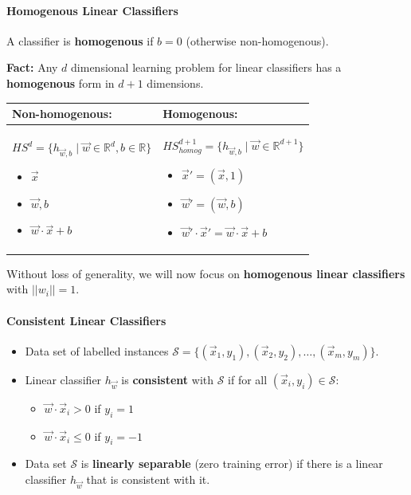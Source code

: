 \paragraph{Homogenous Linear Classifiers}

A classifier is \textbf{homogenous} if $b = 0$ (otherwise non-homogenous).

\textbf{Fact:} Any $d$ dimensional learning problem for linear classifiers has a \textbf{homogenous} form in $d+1$ dimensions.

\begin{center}
\begin{tabular}{|p{}|p{}|}
\hline
\textbf{Non-homogenous:} &
\textbf{Homogenous:} \\
\hline
$HS^d = \{ h_{\vec{w},b} \mid \vec{w} \in \mathbb{R}^d, b \in \mathbb{R} \}$

\begin{itemize}
    \item $\vec{x}$
    \item $\vec{w}, b$
    \item $\vec{w} \cdot \vec{x} + b$
\end{itemize}
&
$HS^{d+1}_{homog} = \{ h_{\vec{w},b} \mid \vec{w} \in \mathbb{R}^{d+1} \}$

\begin{itemize}
    \item $\vec{x}' = (\vec{x}, 1)$
    \item $\vec{w}' = (\vec{w}, b)$
    \item $\vec{w}' \cdot \vec{x}' = \vec{w} \cdot \vec{x} + b$
\end{itemize}
\\
\hline
\end{tabular}
\end{center}

Without loss of generality, we will now focus on \textbf{homogenous linear classifiers} with $||w_i|| = 1$.


\paragraph{Consistent Linear Classifiers}

\begin{itemize}
    \item Data set of labelled instances $\mathcal{S} = \{ (\vec{x}_1, y_1), (\vec{x}_2, y_2), \ldots, (\vec{x}_m, y_m) \}$.
    \item Linear classifier $h_{\vec{w}}$ is \textbf{consistent} with $\mathcal{S}$ if for all $(\vec{x}_i, y_i) \in \mathcal{S}$:
    \begin{itemize}
        \item $\vec{w} \cdot \vec{x}_i > 0$ if $y_i = 1$
        \item $\vec{w} \cdot \vec{x}_i \leq 0$ if $y_i = -1$
    \end{itemize}
    \item Data set $\mathcal{S}$ is \textbf{linearly separable} (zero training error) if there is a linear classifier $h_{\vec{w}}$ that is consistent with it.
\end{itemize}

